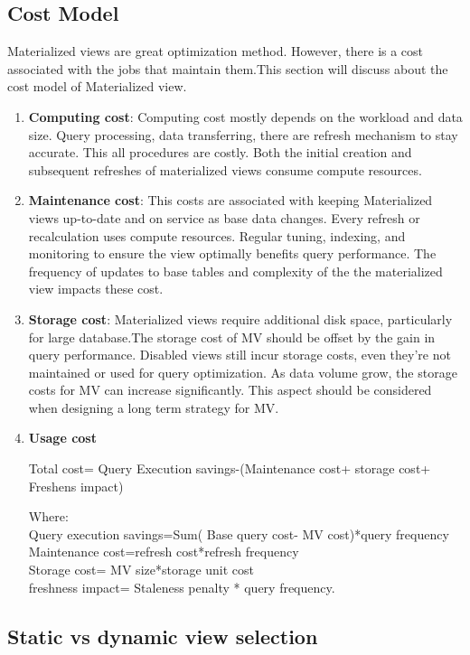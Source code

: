  \subsection{Cost Model}
Materialized views are great optimization method. However, there is a cost associated with the jobs that maintain them.This section will discuss about the cost model of Materialized view.
 \begin{enumerate}[label=\alph*)]
    \item \textbf{Computing cost}: Computing cost mostly depends on the workload and data size. Query processing, data transferring, there are refresh mechanism to stay accurate. This all procedures are costly. Both the initial creation and subsequent refreshes of materialized views consume compute resources.
    \item \textbf{Maintenance cost}: This costs are associated with keeping Materialized views up-to-date and on service as base data changes. Every refresh or recalculation uses compute resources. Regular tuning, indexing, and monitoring to ensure the view optimally benefits query performance. The frequency of updates to base tables and complexity of the the materialized view impacts these cost. 
    \item \textbf{Storage cost}: Materialized views require additional disk space, particularly for large database.The storage cost of MV should be offset by the gain in query performance. Disabled views  still incur storage costs, even  they're not maintained or used for query optimization. As data volume grow, the storage costs for MV can increase significantly. This  aspect should be considered when designing a long term strategy for MV. 
    
    \item \textbf{Usage cost}
    
  Total cost= Query Execution savings-(Maintenance cost+ storage cost+ Freshens impact)

  Where:\\
  Query execution savings=Sum( Base query cost- MV cost)*query frequency \\
  Maintenance cost=refresh cost*refresh frequency\\
  Storage cost= MV size*storage unit cost\\
  freshness impact= Staleness penalty * query frequency.
 \cite{10.1145/2206869.2206874}\\
  
\end{enumerate}
 \subsection{ Static vs dynamic view selection }
